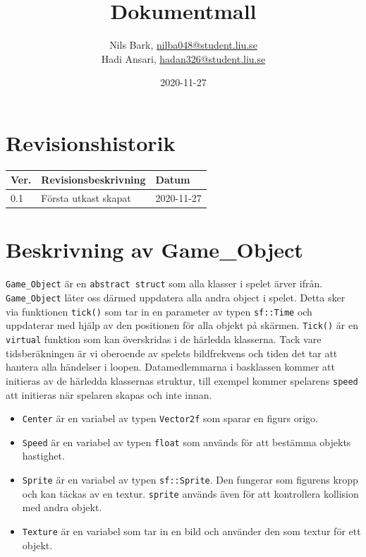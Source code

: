\documentclass{TDP003mall}
\author{Nils Bark, \url{nilba048@student.liu.se}\\
  Hadi Ansari, \url{hadan326@student.liu.se}}
\title{Dokumentmall}
\date{2020-11-27}
\begin{document}
\projectpage
\section{Revisionshistorik}
\begin{table}[!h]
\begin{tabularx}{\linewidth}{|l|X|l|}
\hline
Ver. & Revisionsbeskrivning & Datum \\\hline
0.1 & Första utkast skapat & 2020-11-27\\\hline
\end{tabularx}
\end{table}

\section{Beskrivning av Game\_Object}
\texttt{Game\_Object} är en \texttt{abstract struct} som alla klasser i spelet ärver ifrån. 
\texttt{Game\_Object} låter oss därmed uppdatera alla andra object i spelet. 
Detta sker via funktionen \texttt{tick()} som tar in en parameter av typen \texttt{sf::Time} och uppdaterar med hjälp av den positionen för alla objekt på skärmen.
\texttt{Tick()} är en \texttt{virtual} funktion som kan överskridas i de härledda klasserna.
Tack vare tidsberäkningen är vi oberoende av spelets bildfrekvens och tiden det tar att hantera alla händelser i loopen.
Datamedlemmarna i basklassen kommer att initieras av de härledda klassernas struktur, 
till exempel kommer spelarens \texttt{speed} att initieras när spelaren skapas och inte innan.

\begin{itemize}
\item \texttt{Center} är en variabel av typen \texttt{Vector2f} som sparar en figurs origo.
\item \texttt{Speed} är en variabel av typen \texttt{float} som används för att bestämma objekts hastighet. 
\item \texttt{Sprite} är en variabel av typen \texttt{sf::Sprite}. Den fungerar som figurens kropp och kan täckas av en textur.
\texttt{sprite} används även för att kontrollera kollision med andra objekt.
\item \texttt{Texture} är en variabel som tar in en bild och använder den som textur för ett objekt.
\end{itemize}
\end{document}
